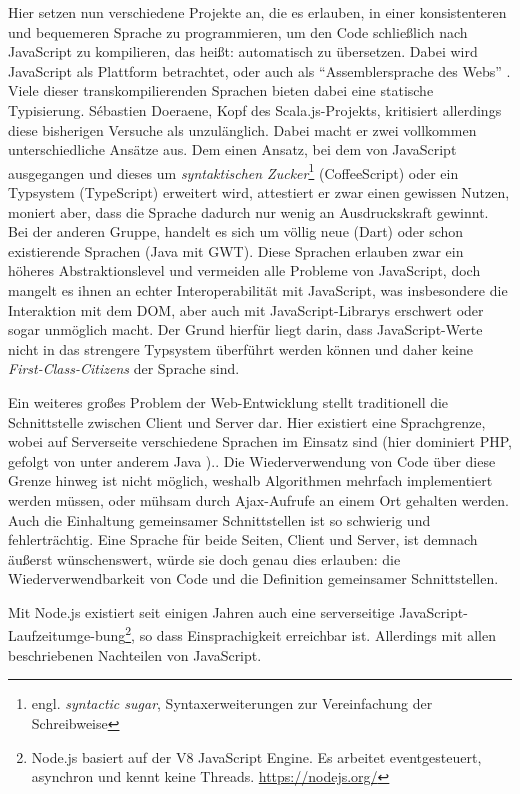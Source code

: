 \documentclass[a4paper, 12pt, hidelinks, listof=totoc, listoftables=totoc, bibliography=totoc]{scrreprt}
\begin{document}
Hier setzen nun verschiedene Projekte an, die es erlauben, in einer konsistenteren und bequemeren Sprache zu programmieren, um den Code schließlich nach JavaScript zu kompilieren, das heißt: automatisch zu übersetzen. Dabei wird JavaScript als Plattform betrachtet, oder auch als "`Assemblersprache des Webs"' \cite{meijer2011.JLA}. Viele dieser transkompilierenden Sprachen bieten dabei eine statische Typisierung. Sébastien Doeraene, Kopf des Scala.js-Projekts, kritisiert allerdings diese bisherigen Versuche als unzulänglich. Dabei macht er zwei vollkommen unterschiedliche Ansätze aus. Dem einen Ansatz, bei dem von \mbox{JavaScript} ausgegangen und dieses um \emph{syntaktischen Zucker}\footnote{engl. \emph{syntactic sugar}, Syntaxerweiterungen zur Vereinfachung der Schreibweise} (CoffeeScript) oder ein Typsystem (TypeScript) erweitert wird, attestiert er zwar einen gewissen Nutzen, moniert aber, dass die Sprache dadurch nur wenig an Ausdruckskraft gewinnt. Bei der anderen Gruppe, handelt es sich um völlig neue (Dart) oder schon existierende Sprachen (Java mit GWT). Diese Sprachen erlauben zwar ein höheres Abstraktionslevel und vermeiden alle Probleme von JavaScript, doch mangelt es ihnen an echter Interoperabilität mit \mbox{JavaScript}, was insbesondere die Interaktion mit dem \ac{DOM}, aber auch mit JavaScript-Librarys erschwert oder sogar unmöglich macht. Der Grund hierfür liegt darin, dass JavaScript-Werte nicht in das strengere Typsystem überführt werden können und daher keine \emph{First-Class-Citizens} der Sprache sind.\cite[S. 1]{doeraene2013.TDI}

Ein weiteres großes Problem der Web-Entwicklung stellt traditionell die Schnittstelle zwischen Client und Server dar. Hier existiert eine Sprachgrenze, wobei auf Serverseite verschiedene Sprachen im Einsatz sind (hier dominiert PHP, gefolgt von unter anderem Java \cite{w3techs.SRV}).. Die Wiederverwendung von Code über diese Grenze hinweg ist nicht möglich, weshalb Algorithmen mehrfach implementiert werden müssen, oder mühsam durch Ajax-Aufrufe an einem Ort gehalten werden. Auch die Einhaltung gemeinsamer Schnittstellen ist so schwierig und fehlerträchtig. Eine Sprache für beide Seiten, Client und Server, ist demnach äußerst wünschenswert, würde sie doch genau dies erlauben: die Wiederverwendbarkeit von Code und die Definition gemeinsamer Schnittstellen. \cite[\#SharingCode]{haoyi.HOS}

Mit Node.js existiert seit einigen Jahren auch eine serverseitige JavaScript-Laufzeitumge-bung\footnote{Node.js basiert auf der V8 JavaScript Engine. Es arbeitet eventgesteuert, asynchron und kennt keine Threads. \url{https://nodejs.org/}}, so dass Einsprachigkeit erreichbar ist. Allerdings mit allen beschriebenen Nachteilen von JavaScript.
\end{document}
